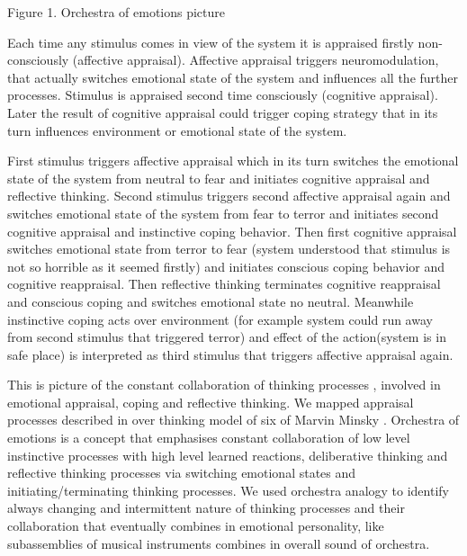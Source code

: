\begin{center}
Figure 1. Orchestra of emotions picture
\end{center}

Each time any stimulus comes in view of the system it is appraised firstly non-consciously (affective appraisal). Affective appraisal triggers neuromodulation, that actually switches emotional state of the system and influences all the further processes. Stimulus is appraised second time consciously (cognitive appraisal). Later the result of cognitive appraisal could trigger coping strategy that in its turn influences environment or emotional state of the system.

First stimulus triggers affective appraisal which in its turn switches the emotional state of the system from neutral to fear and initiates cognitive appraisal and reflective thinking. Second stimulus triggers second affective appraisal again and switches emotional state of the system from fear to terror and initiates second cognitive appraisal and instinctive coping behavior. Then first cognitive appraisal switches emotional state from terror to fear (system understood that stimulus is not so horrible as it seemed firstly) and initiates conscious coping behavior and cognitive reappraisal. Then reflective thinking terminates cognitive reappraisal and conscious coping and switches emotional state no neutral. Meanwhile instinctive coping acts over environment (for example system could run away from second stimulus that triggered terror) and effect of the action(system is in safe place) is interpreted as third stimulus that triggers affective appraisal again.

This is picture of the constant collaboration of thinking processes \cite{emotionmachine}, involved in emotional appraisal, coping and reflective thinking. We mapped appraisal processes described in \cite{putting_appraisal_in_context, appraisal_determinants_of_emotions, appraisal_considered_as_a_process} over thinking model of six of Marvin Minsky \cite{emotionmachine}. Orchestra of emotions is a concept that emphasises constant collaboration of low level instinctive processes with high level learned reactions, deliberative thinking and reflective thinking processes via switching emotional states and initiating/terminating thinking processes. We used orchestra analogy to identify always changing and intermittent nature of thinking processes and their  collaboration that eventually combines in emotional personality, like subassemblies of musical instruments combines in overall sound of orchestra.

